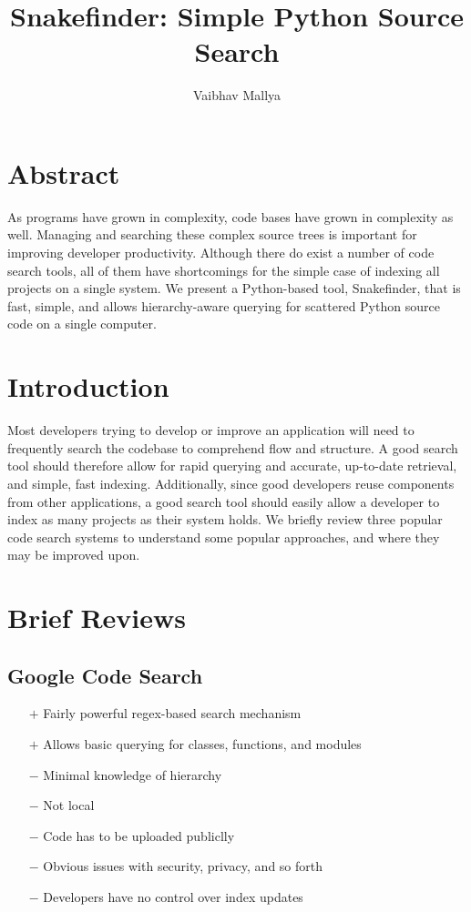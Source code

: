 \documentclass{article}
\begin{document}
\title{Snakefinder: Simple Python Source Search}
\author{Vaibhav Mallya}
\maketitle

\section{Abstract}

As programs have grown in complexity, code bases have grown in complexity as well. Managing and searching these complex source trees is important for improving developer productivity. Although there do exist a number of code search tools, all of them have shortcomings for the simple case of indexing all projects on a single system. We present a Python-based tool, Snakefinder, that is fast, simple, and allows hierarchy-aware querying for scattered Python source code on a single computer.

\section{Introduction}
Most developers trying to develop or improve an application will need to frequently search the codebase to comprehend flow and structure. A good search tool should therefore allow for rapid querying and accurate, up-to-date retrieval, and simple, fast indexing. Additionally, since good developers reuse components from other applications, a good search tool should easily allow a developer to index as many projects as their system holds. We briefly review three popular code search systems to understand some popular approaches, and where they may be improved upon.


\section{Brief Reviews}
\subsection{Google Code Search}\cite{Google}
	\begin{itemize}
    \item[$+$] Fairly powerful regex-based search mechanism
    \item[$+$] Allows basic querying for classes, functions, and modules

    \item[$-$] Minimal knowledge of hierarchy    
	\item[$-$] Not local  
    \item[$-$] Code has to be uploaded publiclly
    \item[$-$] Obvious issues with security, privacy, and so forth
    \item[$-$] Developers have no control over index updates
	\end{itemize}
	
\end{document}
